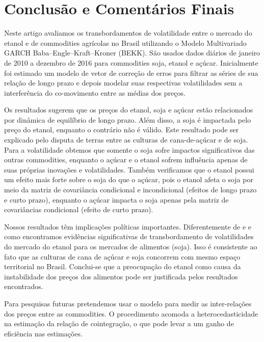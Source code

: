 \section{Conclusão e Comentários Finais}

Neste artigo avaliamos os transbordamentos de volatilidade entre o mercado do etanol e de commodities agrícolas no Brasil utilizando o Modelo Multivariado GARCH Baba–Engle–Kraft–Kroner (BEKK). São usados dados diários de janeiro de 2010 a dezembro de 2016 para commodities soja, etanol e açúcar. Inicialmente foi estimado um modelo de vetor de correção de erros para filtrar as séries de sua relação de longo prazo e depois modelar suas respectivas volatilidades sem a interferência do co-movimento entre as médias dos preços.

Os resultados sugerem que os preços do etanol, soja e açúcar estão relacionados por dinâmica de equilíbrio de longo prazo. Além disso, a soja é impactada pelo  preço do etanol, enquanto o contrário não é válido. Este resultado pode ser explicado pelo disputa de terras entre as culturas de cana-de-açúcar e de soja. Para a volatilidade obtemos que  somente o soja sofre impactos significativos das outras commodities, enquanto o açúcar e o etanol sofrem influência apenas de suas próprias inovações e volatilidades. Também verificamos que  o etanol possui um efeito mais forte sobre o soja do que o açúcar, pois o etanol afeta o soja por meio da matriz de covariância condicional e incondicional (efeitos de longo prazo e curto prazo), enquanto o açúcar impacta o soja apenas pela matriz de covariâncias condicional (efeito de curto prazo).

Nossos resultados têm implicações políticas importantes. Diferentemente de  e  e como  encontramos evidências significativas de transbordamento de volatilidades do mercado do etanol para os mercados de alimentos (soja). Isso é consistente ao fato que as culturas de cana de açúcar e soja concorrem com mesmo espaço territorial no Brasil. Conclui-se que a preocupação do etanol como causa da instabilidade dos preços dos alimentos pode ser justificada pelos resultados encontrados. 

Para pesquisas futuras pretendemos usar o modelo   para medir as inter-relações dos preços entre as commodities. O procedimento  acomoda a heterocedasticidade na estimação da relação de cointegração, o que pode levar  a  um ganho de eficiência nas estimações. 


